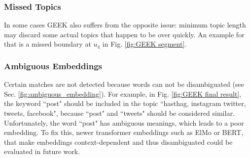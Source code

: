    \subsubsection{Missed Topics}
        In some cases GEEK also suffers from the opposite issue: minimum topic length may discard some actual topics that happen to be over quickly. An example for that is a missed boundary at $u_4$ in Fig. \ref{fig:GEEK segment}.
        
    \subsubsection{Ambiguous Embeddings}
        Certain matches are not detected because words can not be disambiguated (see Sec. \ref{fig:ambiguous_embedding}). For example, in Fig. \ref{fig:GEEK final result}, the keyword ``post" should be included in the topic ``hasthag, instagram twitter, tweets, facebook", because ``post" and ``tweets" should be considered similar. Unfortunately, the word ``post" has ambiguous meanings, which leads to a poor embedding. To fix this, newer transformer embeddings such as ElMo\cite{peters2018elmo} or BERT\cite{devlin2018bert}, that make embeddings context-dependent and thus disambiguated could be evaluated in future work. \newline
        
